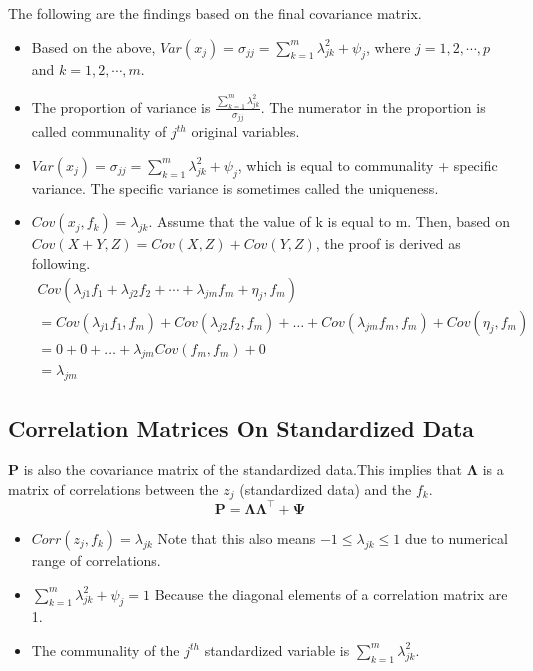 \documentclass{article}
\begin{document}
The following are the findings based on the final covariance matrix.
\begin{itemize}
    \item Based on the above, $Var(x_j)=\sigma_{jj}=\sum_{k=1}^m\lambda_{jk}^2+\psi_j$, where $j=1,2,\cdots,p$ and $k=1,2,\cdots,m$.
    \item The proportion of variance is $\frac{\sum_{k=1}^m\lambda_{jk}^2}{\sigma_{jj}}$. The numerator in the proportion is called communality of $j^{th}$ original variables.
    \item $Var(x_j)=\sigma_{jj}=\sum_{k=1}^m\lambda_{jk}^2+\psi_j$, which is equal to communality + specific variance. The specific variance is sometimes called the uniqueness. 
    \item $Cov(x_j,f_k)=\lambda_{jk}$. Assume that the value of k is equal to m. Then, based on $Cov(X+Y,Z)=Cov(X,Z)+Cov(Y,Z)$, the proof is derived as following.
    \begin{equation*}
        \begin{aligned}
        Cov(\lambda_{j1}f_1+\lambda_{j2}f_2+\cdots+\lambda_{jm}f_m+\eta_j,f_m)\\
        = Cov(\lambda_{j1}f_1,f_m)+Cov(\lambda_{j2}f_2,f_m)+\hdots+Cov(\lambda_{jm}f_m,f_m)+Cov(\eta_j,f_m)\\
        = 0 + 0 + \hdots + \lambda_{jm}Cov(f_m,f_m)+0\\
        = \lambda_{jm}
        \end{aligned}
    \end{equation*}
\end{itemize}

\subsection{Correlation Matrices On Standardized Data}

$\mathbf{P}$ is also the covariance matrix of the standardized data.This implies that $\mathbf{\Lambda}$ is a matrix of correlations between the $z_j$ (standardized data) and the $f_k$.
\[\mathbf{P}=\mathbf{\Lambda}\mathbf{\Lambda}^\intercal+\mathbf{\Psi}\]
\begin{itemize}
    \item $Corr(z_j,f_k)=\lambda_{jk}$ Note that this also means $-1\leq\lambda_{jk}\leq1$ due to numerical range of correlations.
    \item $\sum_{k=1}^m\lambda_{jk}^2+\psi_j=1$ Because the diagonal elements of a correlation matrix are 1.
    \item The communality of the $j^{th}$ standardized variable is $\sum_{k=1}^m\lambda_{jk}^2$.
\end{itemize}
\end{document}

